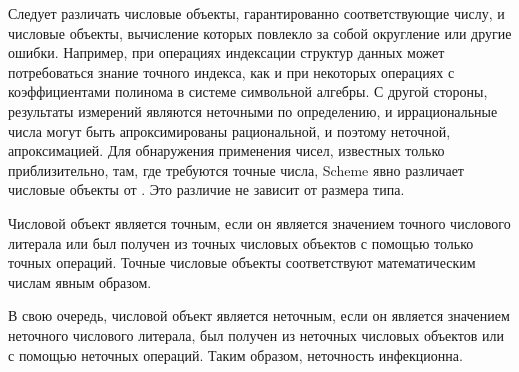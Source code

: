 Следует различать числовые объекты, гарантированно
соответствующие числу, и числовые объекты, вычисление которых повлекло за собой округление или
другие ошибки. Например, при операциях индексации структур данных может потребоваться знание точного
индекса, как и при некоторых операциях с коэффициентами полинома в системе символьной алгебры. С
другой стороны, результаты измерений являются неточными по определению, и иррациональные
числа могут быть апроксимированы рациональной, и поэтому неточной, апроксимацией. Для обнаружения
применения чисел, известных только приблизительно, там, где требуются точные числа,
Scheme явно различает  числовые объекты от . Это
различие не зависит от размера типа.\vspace{0.6mm}

Числовой объект является точным, если он является значением точного числового литерала или был
получен из точных числовых объектов с помощью только точных операций. Точные числовые объекты
соответствуют математическим числам явным образом.\vspace{0.6mm}

В свою очередь, числовой объект является неточным, если он является значением неточного
числового литерала, был получен из неточных числовых объектов или с помощью неточных
операций. Таким образом, неточность инфекционна.\vspace{0.6mm}


